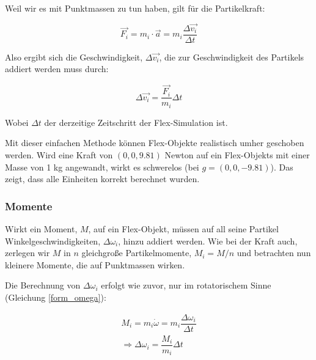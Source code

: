 Weil wir es mit Punktmassen zu tun haben, gilt für die Partikelkraft:

\begin{equation}
\vec{F_i} = m_i \cdot \vec{a} = m_i \dfrac{\Delta \vec{v_i}}{\Delta t}
\label{form_F}
\end{equation}

Also ergibt sich die Geschwindigkeit, $\Delta \vec{v_i}$, die zur Geschwindigkeit des Partikels addiert werden muss durch:

\begin{equation}
\Delta \vec{v_i} = \dfrac{\vec{F_i}}{m_i}\Delta t
\label{form_dv}
\end{equation}

Wobei $\Delta t$ der derzeitige Zeitschritt der Flex-Simulation ist. 


Mit dieser einfachen Methode können Flex-Objekte realistisch umher geschoben werden. Wird eine Kraft von $(0 , 0 , 9.81 )$ Newton auf ein Flex-Objekts mit einer Masse von 1 kg angewandt, wirkt es schwerelos (bei $g=(0 , 0 , -9.81 )$). Das zeigt, dass alle Einheiten korrekt berechnet wurden.


\subsubsection{Momente}

Wirkt ein Moment, $M$, auf ein Flex-Objekt, müssen auf all seine Partikel Winkelgeschwindigkeiten, $\Delta \omega_i$, hinzu addiert werden. Wie bei der Kraft auch, zerlegen wir $M$ in $n$ gleichgroße Partikelmomente, $M_i=M/n$ und betrachten nun kleinere Momente, die auf Punktmassen wirken.

Die Berechnung von $\Delta \omega_i$ erfolgt wie zuvor, nur im rotatorischem Sinne (Gleichung \ref{form_omega}):

\begin{equation}
\begin{split}
M_i = m_i   \dot{\omega} = m_i \dfrac{\Delta \omega_i}{\Delta t} \\
\Rightarrow  \Delta \omega_i = \dfrac{M_i}{m_i} \Delta t
\end{split}
\label{form_omega}
\end{equation}


